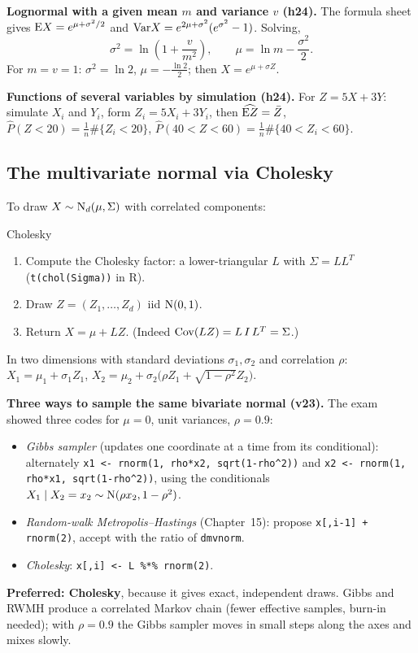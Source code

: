 \textbf{Lognormal with a given mean $m$ and variance $v$ (h24).} The formula sheet gives $\mathrm{E} X = e^{\mu+\sigma^2/2}$ and $\mathrm{Var} X = e^{2\mu+\sigma^2}(e^{\sigma^2}-1)$. Solving,
\[
\sigma^2 = \ln\left(1+\frac{v}{m^2}\right), \qquad \mu = \ln m - \frac{\sigma^2}{2}.
\]
For $m = v = 1$: $\sigma^2 = \ln 2$, $\mu = -\frac{\ln 2}{2}$; then $X = e^{\mu+\sigma Z}$.

\textbf{Functions of several variables by simulation (h24).} For $Z = 5X+3Y$: simulate $X_i$ and $Y_i$, form $Z_i = 5X_i+3Y_i$, then $\widehat{\mathrm{E} Z} = \bar Z$, $\widehat P(Z<20) = \frac1n\#\{Z_i<20\}$, $\widehat P(40<Z<60) = \frac1n\#\{40<Z_i<60\}$.

\subsection{The multivariate normal via Cholesky}
To draw $X\sim\mathrm{N}_d(\mu,\Sigma)$ with correlated components:
\begin{algo}{Cholesky}
\begin{enumerate}
  \item Compute the Cholesky factor: a lower-triangular $L$ with $\Sigma = LL^T$ (\texttt{t(chol(Sigma))} in R).
  \item Draw $Z = (Z_1,\dots,Z_d)$ iid $\mathrm{N}(0,1)$.
  \item Return $X = \mu + LZ$. (Indeed $\mathrm{Cov}(LZ) = L\,I\,L^T = \Sigma$.)
\end{enumerate}
\end{algo}
In two dimensions with standard deviations $\sigma_1,\sigma_2$ and correlation $\rho$:
$X_1 = \mu_1+\sigma_1 Z_1$, $X_2 = \mu_2+\sigma_2\big(\rho Z_1+\sqrt{1-\rho^2}Z_2\big)$.

\textbf{Three ways to sample the same bivariate normal (v23).} The exam showed three codes for $\mu = 0$, unit variances, $\rho = 0.9$:
\begin{itemize}
  \item \emph{Gibbs sampler} (updates one coordinate at a time from its conditional): alternately \texttt{x1 <- rnorm(1, rho*x2, sqrt(1-rho\^{}2))} and \texttt{x2 <- rnorm(1, rho*x1, sqrt(1-rho\^{}2))}, using the conditionals $X_1\mid X_2=x_2\sim\mathrm{N}(\rho x_2,1-\rho^2)$.
  \item \emph{Random-walk Metropolis--Hastings} (Chapter~15): propose \texttt{x[,i-1] + rnorm(2)}, accept with the ratio of \texttt{dmvnorm}.
  \item \emph{Cholesky}: \texttt{x[,i] <- L \%*\% rnorm(2)}.
\end{itemize}
\textbf{Preferred: Cholesky}, because it gives exact, independent draws. Gibbs and RWMH produce a correlated Markov chain (fewer effective samples, burn-in needed); with $\rho = 0.9$ the Gibbs sampler moves in small steps along the axes and mixes slowly.

